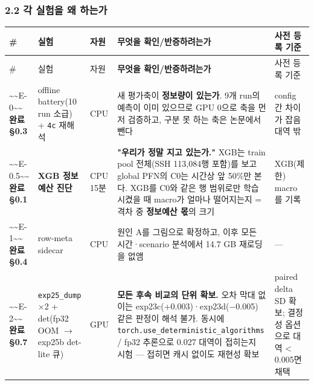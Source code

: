 \subsubsection{2.2 각 실험을 왜 하는가}
\begingroup
\footnotesize
\begin{longtable}{>{\raggedright\arraybackslash}p{}>{\raggedright\arraybackslash}p{}>{\raggedright\arraybackslash}p{}>{\raggedright\arraybackslash}p{}>{\raggedright\arraybackslash}p{}}
\toprule
\# & 실험 & 자원 & \textbf{무엇을 확인/\allowbreak{}반증하려는가} & 사전 등록 기준 \\ \midrule
\endfirsthead
\# & 실험 & 자원 & \textbf{무엇을 확인/\allowbreak{}반증하려는가} & 사전 등록 기준 \\ \midrule
\endhead
{}\textasciitilde{}\textasciitilde{}E-0\textasciitilde{}\textasciitilde{} \textbf{완료 §0.3} & offline battery(10 run 소급) +\allowbreak{} \texttt{4c} 재해석 & CPU & 새 평가축이 \textbf{정보량이 있는가}. 9개 run의 예측이 이미 있으므로 GPU 0으로 축을 먼저 검증하고, 구분 못 하는 축은 논문에서 뺀다 & config 간 차이가 잡음 대역 밖 \\
{}\textasciitilde{}\textasciitilde{}E-0.5\textasciitilde{}\textasciitilde{} \textbf{완료 §0.1} & \textbf{XGB 정보예산 진단} & CPU 15분 & \textbf{"우리가 정말 지고 있는가."} XGB는 train pool 전체(SSH 113,084행 포함)를 보고 global PFN의 C0는 시간상 앞 50\%만 본다. XGB를 C0와 같은 행 범위로만 학습시켰을 때 macro가 얼마나 떨어지는지 =\allowbreak{} 격차 중 \textbf{정보예산 몫}의 크기 & XGB(제한) macro를 기록 \\
{}\textasciitilde{}\textasciitilde{}E-1\textasciitilde{}\textasciitilde{} \textbf{완료 §0.4} & row-meta sidecar & CPU & 원인 A를 그림으로 확정하고, 이후 모든 시간·scenario 분석에서 14.7 GB 재로딩을 없앰 & — \\
{}\textasciitilde{}\textasciitilde{}E-2\textasciitilde{}\textasciitilde{} \textbf{완료 §0.7} & \texttt{exp25\_\allowbreak{}\allowbreak{}du\allowbreak{}mp} ×2 +\allowbreak{} det(fp32 OOM  \ensuremath{\rightarrow}  exp25b det-lite 큐) & GPU & \textbf{모든 후속 비교의 단위 확보.} 오차 막대 없이는 exp23c(+\allowbreak{}0.003)·exp23d(−0.005) 같은 판정이 해석 불가. 동시에 \texttt{torch.\allowbreak{}us\allowbreak{}e\_\allowbreak{}\allowbreak{}determ\allowbreak{}inistic\_\allowbreak{}\allowbreak{}algorith\allowbreak{}ms} /\allowbreak{} fp32 추론으로 0.027 대역이 접히는지 시험 — 접히면 캐시 없이도 재현성 확보 & paired delta SD 확보; 결정성 옵션으로 대역 < 0.005면 채택 \\

\end{longtable}
